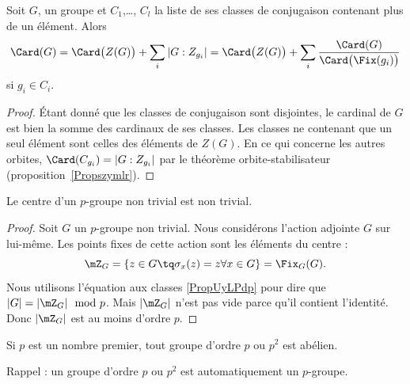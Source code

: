 \begin{corollary}
    Soit \( G\), un groupe et \( C_1\),\ldots, \( C_l\) la liste de ses classes de conjugaison contenant plus de un élément. Alors
    \begin{equation}        \label{EqkgGmoq}
        \Card(G)=\Card\big( Z(G) \big)+\sum_i| G:Z_{g_i} |=\Card\big( Z(G) \big)+\sum_i\frac{ \Card(G) }{ \Card\big( \Fix(g_i) \big) }
    \end{equation}
    si \( g_i\in C_i\).
\end{corollary}

\begin{proof}
    Étant donné que les classes de conjugaison sont disjointes, le cardinal de \( G\) est bien la somme des cardinaux de ses classes. Les classes ne contenant que un seul élément sont celles des éléments de \( Z(G)\). En ce qui concerne les autres orbites, \( \Card(C_{g_i})=| G:Z_{g_i} |\) par le théorème orbite-stabilisateur (proposition~\ref{Propszymlr}).
\end{proof}



\begin{theorem} \label{ThoImkljy}
    Le centre d'un \( p\)-groupe non trivial est non trivial.
\end{theorem}

\begin{proof}
    Soit \( G\) un $p$-groupe non trivial. Nous considérons l'action adjointe \( G\) sur lui-même. Les points fixes de cette action sont les éléments du centre :
    \begin{equation}
        \mZ_G=\{ z\in G\tq \sigma_x(z)=z\forall x\in G \}=\Fix_G(G).
    \end{equation}
    Nous utilisons l'équation aux classes \eqref{PropUyLPdp} pour dire que \( | G |=| \mZ_G |\mod p\). Mais \( | \mZ_G |\) n'est pas vide parce qu'il contient l'identité. Donc \( | \mZ_G |\) est au moins d'ordre \( p\).
\end{proof}

\begin{proposition} \label{PropssttFK}
    Si \( p\) est un nombre premier, tout groupe d'ordre \( p\) ou \( p^2\) est abélien.
\end{proposition}
Rappel : un groupe d'ordre \( p\) ou \( p^2\) est automatiquement un $p$-groupe.


